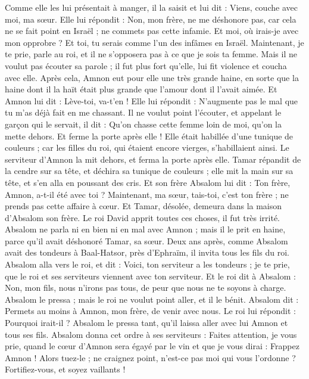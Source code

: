 \begin{multicols}{2}
Comme elle les lui présentait à manger, il la saisit et lui dit : Viens, couche avec moi, ma sœur.
Elle lui répondit : Non, mon frère, ne me déshonore pas, car cela ne se fait point en Israël ; ne commets pas cette infamie.
Et moi, où irais-je avec mon opprobre ? Et toi, tu serais comme l’un des infâmes en Israël. Maintenant, je te prie, parle au roi, et il ne s’opposera pas à ce que je sois ta femme.
Mais il ne voulut pas écouter sa parole ; il fut plus fort qu'elle, lui fit violence et coucha avec elle.
Après cela, Amnon eut pour elle une très grande haine, en sorte que la haine dont il la haït était plus grande que l'amour dont il l’avait aimée. Et Amnon lui dit : Lève-toi, va-t’en !
Elle lui répondit : N’augmente pas le mal que tu m’as déjà fait en me chassant.
Il ne voulut point l'écouter, et appelant le garçon qui le servait, il dit : Qu'on chasse cette femme loin de moi, qu'on la mette dehors. Et ferme la porte après elle !
Elle était habillée d'une tunique de couleurs ; car les filles du roi, qui étaient encore vierges, s’habillaient ainsi. Le serviteur d’Amnon la mit dehors, et ferma la porte après elle.
Tamar répandit de la cendre sur sa tête, et déchira sa tunique de couleurs ; elle mit la main sur sa tête, et s'en alla en poussant des cris.
Et son frère Absalom lui dit : Ton frère, Amnon, a-t-il été avec toi ? Maintenant, ma sœur, tais-toi, c’est ton frère ; ne prends pas cette affaire à cœur. Et Tamar, désolée, demeura dans la maison d'Absalom son frère.
Le roi David apprit toutes ces choses, il fut très irrité.
Absalom ne parla ni en bien ni en mal avec Amnon ; mais il le prit en haine, parce qu’il avait déshonoré Tamar, sa sœur.
Deux ans après, comme Absalom avait des tondeurs à Baal-Hatsor, près d'Ephraïm, il invita tous les fils du roi.
Absalom alla vers le roi, et dit : Voici, ton serviteur a les tondeurs ; je te prie, que le roi et ses serviteurs viennent avec ton serviteur.
Et le roi dit à Absalom : Non, mon fils, nous n’irons pas tous, de peur que nous ne te soyons à charge. Absalom le pressa ; mais le roi ne voulut point aller, et il le bénit.
Absalom dit : Permets au moins à Amnon, mon frère, de venir avec nous. Le roi lui répondit : Pourquoi irait-il ?
Absalom le pressa tant, qu'il laissa aller avec lui Amnon et tous ses fils.
Absalom donna cet ordre à ses serviteurs : Faites attention, je vous prie, quand le cœur d'Amnon sera égayé par le vin et que je vous dirai : Frappez Amnon ! Alors tuez-le ; ne craignez point, n'est-ce pas moi qui vous l’ordonne ? Fortifiez-vous, et soyez vaillants !

\end{multicols}
